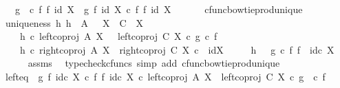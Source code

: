 \begin{isabellebody}
\ \ \ {\isachardoublequoteopen}{\isacharparenleft}{\kern0pt}g\ \ {\isasymcirc}\isactrlsub c\ f{\isacharparenright}{\kern0pt}\ {\isasymbowtie}\isactrlsub f\ id\ X\ {\isacharequal}{\kern0pt}\ {\isacharparenleft}{\kern0pt}g\ {\isasymbowtie}\isactrlsub f\ id\ X{\isacharparenright}{\kern0pt}\ {\isasymcirc}\isactrlsub c\ {\isacharparenleft}{\kern0pt}f\ {\isasymbowtie}\isactrlsub f\ id\ X{\isacharparenright}{\kern0pt}{\isachardoublequoteclose}\isanewline
%
\isadelimproof
%
\endisadelimproof
%
\isatagproof
{}\isamarkupfalse%
\ {\isacharminus}{\kern0pt}\ \isanewline
\ \ \isamarkupfalse%
\ cfunc{\isacharunderscore}{\kern0pt}bowtie{\isacharunderscore}{\kern0pt}prod{\isacharunderscore}{\kern0pt}unique\isanewline
\ \ \isamarkupfalse%
\ uniqueness{\isacharcolon}{\kern0pt}\ {\isachardoublequoteopen}{\isasymforall}h{\isachardot}{\kern0pt}\ h\ {\isacharcolon}{\kern0pt}\ A\ {\isasymCoprod}\ \ X\ {\isasymrightarrow}\ C\ {\isasymCoprod}\ X\ {\isasymand}\isanewline
\ \ \ \ h\ {\isasymcirc}\isactrlsub c\ left{\isacharunderscore}{\kern0pt}coproj\ A\ X\ \ {\isacharequal}{\kern0pt}\ left{\isacharunderscore}{\kern0pt}coproj\ C\ X\ {\isasymcirc}\isactrlsub c\ {\isacharparenleft}{\kern0pt}g\ {\isasymcirc}\isactrlsub c\ f{\isacharparenright}{\kern0pt}\ {\isasymand}\isanewline
\ \ \ \ h\ {\isasymcirc}\isactrlsub c\ right{\isacharunderscore}{\kern0pt}coproj\ A\ X\ {\isacharequal}{\kern0pt}\ right{\isacharunderscore}{\kern0pt}coproj\ C\ X\ {\isasymcirc}\isactrlsub c\ \ id{\isacharparenleft}{\kern0pt}X{\isacharparenright}{\kern0pt}\ {\isasymlongrightarrow}\isanewline
\ \ \ \ h\ {\isacharequal}{\kern0pt}\ \ {\isacharparenleft}{\kern0pt}g\ {\isasymcirc}\isactrlsub c\ f{\isacharparenright}{\kern0pt}\ {\isasymbowtie}\isactrlsub f\ \ id\isactrlsub c\ X{\isachardoublequoteclose}\isanewline
\ \ \ \ \isamarkupfalse%
\ assms\ \isamarkupfalse%
\ {\isacharparenleft}{\kern0pt}typecheck{\isacharunderscore}{\kern0pt}cfuncs{\isacharcomma}{\kern0pt}\ simp\ add{\isacharcolon}{\kern0pt}\ cfunc{\isacharunderscore}{\kern0pt}bowtie{\isacharunderscore}{\kern0pt}prod{\isacharunderscore}{\kern0pt}unique{\isacharparenright}{\kern0pt}\isanewline
\isanewline
\ \ \isamarkupfalse%
\ left{\isacharunderscore}{\kern0pt}eq{\isacharcolon}{\kern0pt}\ {\isachardoublequoteopen}\ {\isacharparenleft}{\kern0pt}{\isacharparenleft}{\kern0pt}g\ {\isasymbowtie}\isactrlsub f\ id\isactrlsub c\ X{\isacharparenright}{\kern0pt}\ {\isasymcirc}\isactrlsub c\ {\isacharparenleft}{\kern0pt}f\ {\isasymbowtie}\isactrlsub f\ id\isactrlsub c\ X{\isacharparenright}{\kern0pt}{\isacharparenright}{\kern0pt}\ {\isasymcirc}\isactrlsub c\ left{\isacharunderscore}{\kern0pt}coproj\ A\ X\ {\isacharequal}{\kern0pt}\ left{\isacharunderscore}{\kern0pt}coproj\ C\ X\ {\isasymcirc}\isactrlsub c\ {\isacharparenleft}{\kern0pt}g\ \ {\isasymcirc}\isactrlsub c\ f{\isacharparenright}{\kern0pt}{\isachardoublequoteclose}\isanewline

\end{isabellebody}
